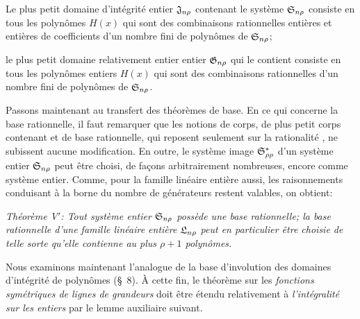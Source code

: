 Le plus petit domaine d’intégrité entier $\mathfrak{J}_{n\rho}$ contenant le système $\mathfrak{S}_{n\rho}$ consiste en tous les polynômes $H(x)$ qui sont des combinaisons rationnelles entières et entières de coefficients d'un nombre fini de polynômes de $\mathfrak{S}_{n\rho}$;

le plus petit domaine relativement entier entier $\mathfrak{G}_{n\rho}$ qui le contient consiste en tous les polynômes entiers $H(x)$ qui sont des combinaisons rationnelles d'un nombre fini de polynômes de $\mathfrak{S}_{n\rho}$.

Passons maintenant au transfert des théorèmes de base. En ce qui concerne la base rationnelle, il faut remarquer que les notions de corps, de plus petit corps contenant et de base rationnelle, qui reposent seulement sur la \og{} rationalité \fg{}, ne subissent aucune modification. En outre, le système image $\mathfrak{S}^*_{\rho\rho}$ d'un système entier $\mathfrak{S}_{n\rho}$ peut être choisi, de façons arbitrairement nombreuses, encore comme système entier. Comme, pour la famille linéaire entière aussi, les raisonnements conduisant à la borne du nombre de générateurs restent valables, on obtient:

\emph{Théorème V$'$: Tout système entier $\mathfrak{S}_{n\rho}$ possède une base rationnelle; la base rationnelle d'une famille linéaire entière $\mathfrak{L}_{n\rho}$ peut en particulier être choisie de telle sorte qu'elle contienne au plus $\rho+1$ polynômes.}

Nous examinons maintenant l'analogue de la base d'involution des domaines d’intégrité de polynômes (\S\ 8). À cette fin, le théorème sur les \emph{fonctions symétriques de lignes de grandeurs} doit être étendu relativement à \emph{l'intégralité sur les entiers} par le lemme auxiliaire suivant.

